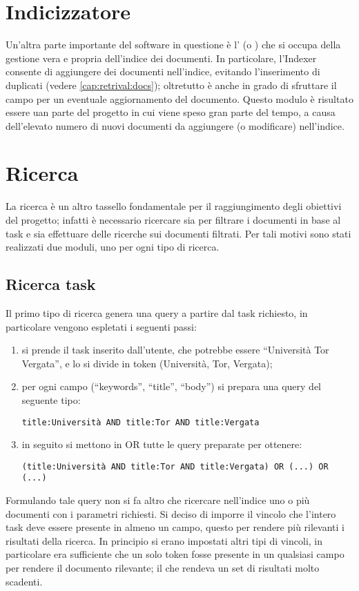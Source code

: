 \section{Indicizzatore}\label{cap:retrival:indexer}
Un'altra parte importante del software in questione è l' (o ) che si occupa della gestione vera e propria dell'indice dei documenti. In particolare, l'Indexer consente di aggiungere dei documenti nell'indice, evitando l'inserimento di duplicati (vedere \ref{cap:retrival:docs}); oltretutto è anche in grado di sfruttare il campo  per un eventuale aggiornamento del documento.
Questo modulo è risultato essere uan parte del progetto in cui viene speso gran parte del tempo, a causa dell'elevato numero di nuovi documenti da aggiungere (o modificare) nell'indice.
\section{Ricerca}\label{cap:retrival:searcher}
La ricerca è un altro tassello fondamentale per il raggiungimento degli obiettivi del progetto; infatti è necessario ricercare sia per filtrare i documenti in base al task e sia effettuare delle ricerche sui documenti filtrati. Per tali motivi sono stati realizzati due moduli, uno per ogni tipo di ricerca.
\subsection{Ricerca task}
Il primo tipo di ricerca genera una query a partire dal task richiesto, in particolare vengono espletati i seguenti passi:
\begin{enumerate}
\item si prende il task inserito dall'utente, che potrebbe essere ``Università Tor Vergata'', e lo si divide in token (Università, Tor, Vergata);
\item per ogni campo (``keywords'', ``title'', ``body'') si prepara una query del seguente tipo:
\begin{center}
\texttt{title:Università AND title:Tor AND title:Vergata}
\end{center}
\item in seguito si mettono in OR tutte le query preparate per ottenere:
\begin{center}
\texttt{(title:Università AND title:Tor AND title:Vergata) OR (...) OR (...)}
\end{center}
\end{enumerate}
Formulando tale query non si fa altro che ricercare nell'indice uno o più documenti con i parametri richiesti. Si deciso di imporre il vincolo che l'intero task deve essere presente in almeno un campo, questo per rendere più rilevanti i risultati della ricerca. In principio si erano impostati altri tipi di vincoli, in particolare era sufficiente che un solo token fosse presente in un qualsiasi campo per rendere il documento rilevante; il che rendeva un set di risultati molto scadenti.
